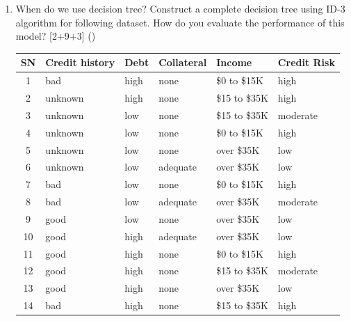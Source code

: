 \documentclass[12pt]{article}
\begin{document}
\begin{enumerate}[topsep=0pt, noitemsep]
      \item When do we use decision tree? Construct a complete decision tree using ID-3 algorithm for following dataset. How do you evaluate the performance of this model? \hfill [2+9+3] ()\\
        \small
        \begin{tabular}{|c|l|l|l|l|l|}
          \hline
          SN & Credit history & Debt & Collateral & Income & Credit Risk \\ \hline
          1 & bad & high & none & \$0 to \$15K & high \\ \hline
          2 & unknown & high & none & \$15 to \$35K & high \\ \hline
          3 & unknown & low & none & \$15 to \$35K & moderate \\ \hline
          4 & unknown & low & none & \$0 to \$15K & high \\ \hline
          5 & unknown & low & none & over \$35K & low \\ \hline
          6 & unknown & low & adequate & over \$35K & low \\ \hline
          7 & bad & low & none & \$0 to \$15K & high \\ \hline
          8 & bad & low & adequate & over \$35K & moderate \\ \hline
          9 & good & low & none & over \$35K & low \\ \hline
          10 & good & high & adequate & over \$35K & low \\ \hline
          11 & good & high & none & \$0 to \$15K & high \\ \hline
          12 & good & high & none & \$15 to \$35K & moderate \\ \hline
          13 & good & high & none & over \$35K & low \\ \hline
          14 & bad & high & none & \$15 to \$35K & high \\ \hline
        \end{tabular}
        \normalsize


\end{enumerate}
\end{document}
